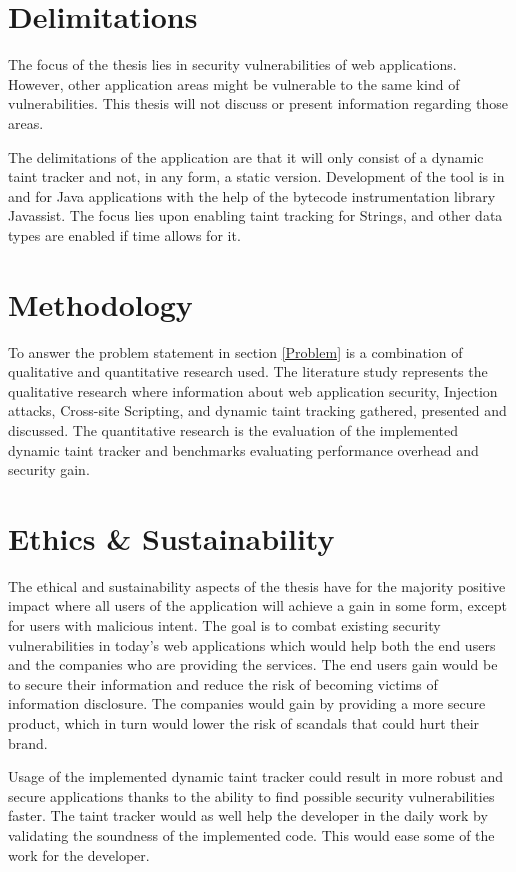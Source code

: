 \section{Delimitations}
\label{Delimitations}
The focus of the thesis lies in security vulnerabilities of web applications. However, other application areas might be vulnerable to the same kind of vulnerabilities.  This thesis will not discuss or present information regarding those areas.

The delimitations of the application are that it will only consist of a dynamic taint tracker and not, in any form, a static version. Development of the tool is in and for Java applications with the help of the bytecode instrumentation library Javassist. The focus lies upon enabling taint tracking for Strings, and other data types are enabled if time allows for it.



\section{Methodology}
\label{Methodology}
To answer the problem statement in section \ref{Problem} is a combination of qualitative and quantitative research used. The literature study represents the qualitative research where information about web application security, Injection attacks, Cross-site Scripting, and dynamic taint tracking gathered, presented and discussed. The quantitative research is the evaluation of the implemented dynamic taint tracker and benchmarks evaluating performance overhead and security gain.



\section{Ethics \& Sustainability}
\label{Structure}
The ethical and sustainability aspects of the thesis have for the majority positive impact where all users of the application will achieve a gain in some form, except for users with malicious intent. The goal is to combat existing security vulnerabilities in today's web applications which would help both the end users and the companies who are providing the services. The end users gain would be to secure their information and reduce the risk of becoming victims of information disclosure. The companies would gain by providing a more secure product, which in turn would lower the risk of scandals that could hurt their brand. 

Usage of the implemented dynamic taint tracker could result in more robust and secure applications thanks to the ability to find possible security vulnerabilities faster. The taint tracker would as well help the developer in the daily work by validating the soundness of the implemented code. This would ease some of the work for the developer.

